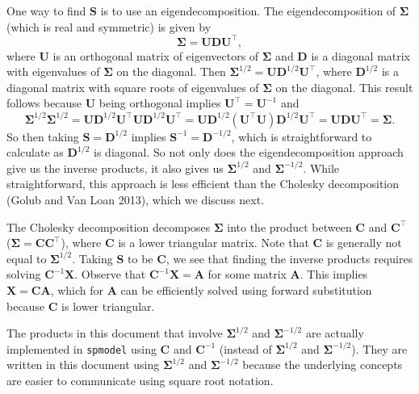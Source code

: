 \documentclass{article}
\begin{document}
One way to find \(\mathbf{S}\) is to use an eigendecomposition. The
eigendecomposition of \(\boldsymbol{\Sigma}\) (which is real and
symmetric) is given by \begin{equation*}
\boldsymbol{\Sigma} = \mathbf{U} \mathbf{D} \mathbf{U}^\top,
\end{equation*} where \(\mathbf{U}\) is an orthogonal matrix of
eigenvectors of \(\boldsymbol{\Sigma}\) and \(\mathbf{D}\) is a diagonal
matrix with eigenvalues of \(\boldsymbol{\Sigma}\) on the diagonal. Then
\(\boldsymbol{\Sigma}^{1/2} = \mathbf{U} \mathbf{D}^{1/2} \mathbf{U}^\top\),
where \(\mathbf{D}^{1/2}\) is a diagonal matrix with square roots of
eigenvalues of \(\boldsymbol{\Sigma}\) on the diagonal. This result
follows because \(\mathbf{U}\) being orthogonal implies
\(\mathbf{U}^\top = \mathbf{U}^{-1}\) and \begin{equation*}
\boldsymbol{\Sigma}^{1/2}\boldsymbol{\Sigma}^{1/2} = \mathbf{U} \mathbf{D}^{1/2} \mathbf{U}^\top \mathbf{U} \mathbf{D}^{1/2} \mathbf{U}^\top = \mathbf{U} \mathbf{D}^{1/2} (\mathbf{U}^\top \mathbf{U}) \mathbf{D}^{1/2} \mathbf{U}^\top = \mathbf{U} \mathbf{D} \mathbf{U}^\top = \boldsymbol{\Sigma}.
\end{equation*} So then taking \(\mathbf{S} = \mathbf{D}^{1/2}\) implies
\(\mathbf{S}^{-1} = \mathbf{D}^{-1/2}\), which is straightforward to
calculate as \(\mathbf{D}^{1/2}\) is diagonal. So not only does the
eigendecomposition approach give us the inverse products, it also gives
us \(\boldsymbol{\Sigma}^{1/2}\) and \(\boldsymbol{\Sigma}^{-1/2}\).
While straightforward, this approach is less efficient than the Cholesky
decomposition (Golub and Van Loan 2013), which we discuss next.

The Cholesky decomposition decomposes \(\boldsymbol{\Sigma}\) into the
product between \(\mathbf{C}\) and \(\mathbf{C}^\top\)
(\(\boldsymbol{\Sigma} = \mathbf{C}\mathbf{C}^\top\)), where
\(\mathbf{C}\) is a lower triangular matrix. Note that \(\mathbf{C}\) is
generally not equal to \(\boldsymbol{\Sigma}^{1/2}\). Taking
\(\mathbf{S}\) to be \(\mathbf{C}\), we see that finding the inverse
products requires solving \(\mathbf{C}^{-1}\mathbf{X}\). Observe that
\(\mathbf{C}^{-1}\mathbf{X} = \mathbf{A}\) for some matrix
\(\mathbf{A}\). This implies \(\mathbf{X} = \mathbf{C}\mathbf{A}\),
which for \(\mathbf{A}\) can be efficiently solved using forward
substitution because \(\mathbf{C}\) is lower triangular.

The products in this document that involve \(\boldsymbol{\Sigma}^{1/2}\)
and \(\boldsymbol{\Sigma}^{-1/2}\) are actually implemented in
\texttt{spmodel} using \(\mathbf{C}\) and \(\mathbf{C}^{-1}\) (instead
of \(\boldsymbol{\Sigma}^{1/2}\) and \(\boldsymbol{\Sigma}^{-1/2}\)).
They are written in this document using \(\boldsymbol{\Sigma}^{1/2}\)
and \(\boldsymbol{\Sigma}^{-1/2}\) because the underlying concepts are
easier to communicate using square root notation.
\end{document}
